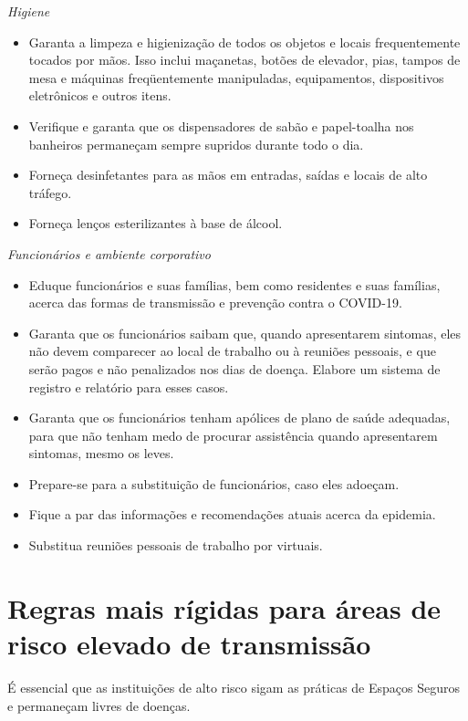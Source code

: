 \documentclass[onecolumn,journal]{IEEEtran}
\begin{document}
\begin{multicols}{2}
\textit{Higiene}

\begin{itemize}
\item Garanta a limpeza e higienização de todos os objetos e locais frequentemente tocados por mãos. Isso inclui maçanetas, botões de elevador, pias, tampos de mesa e máquinas freqüentemente manipuladas, equipamentos, dispositivos eletrônicos e outros itens.
\item Verifique e garanta que os dispensadores de sabão e papel-toalha nos banheiros permaneçam sempre supridos durante todo o dia.
\item Forneça desinfetantes para as mãos em entradas, saídas e locais de alto tráfego.
\item Forneça lenços esterilizantes à base de álcool.
\end{itemize}

\textit{Funcionários e ambiente corporativo}
\begin{itemize}
\item Eduque funcionários e suas famílias, bem como residentes e suas famílias, acerca das formas de transmissão e prevenção contra o COVID-19.
\item Garanta que os funcionários saibam que, quando apresentarem sintomas, eles não devem comparecer ao local de trabalho ou à reuniões pessoais, e que serão pagos e não penalizados nos dias de doença. Elabore um sistema de registro e relatório para esses casos.
\item Garanta que os funcionários tenham apólices de plano de saúde adequadas, para que não tenham medo de procurar assistência quando apresentarem sintomas, mesmo os leves.
\item Prepare-se para a substituição de funcionários, caso eles adoeçam.
\item Fique a par das informações e recomendações atuais acerca da epidemia.
\item Substitua reuniões pessoais de trabalho por virtuais.
\end{itemize}

\section*{Regras mais rígidas para áreas de risco elevado de transmissão}

É essencial que as instituições de alto risco sigam as práticas de Espaços Seguros e permaneçam livres de doenças.

\vspace{1ex}


\end{multicols}
\end{document}
